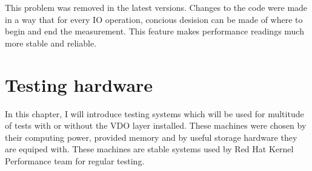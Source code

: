 \documentclass[
  color, %
  table, %
  lof,   %
  lot,   %
]{fithesis3}
\begin{document}
This problem was removed in the latest versions. Changes to the code were made in a way that for every IO operation, concious desision can be made of where to begin and end the measurement. This feature makes performance readings much more stable and reliable.


\chapter{Testing hardware}
In this chapter, I will introduce testing systems which will be used for multitude of tests with or without the VDO layer installed. These machines were chosen by their computing power, provided memory and by useful storage hardware they are equiped with. These machines are stable systems used by Red Hat Kernel Performance team for regular testing.

\label{machines}
\end{document}
